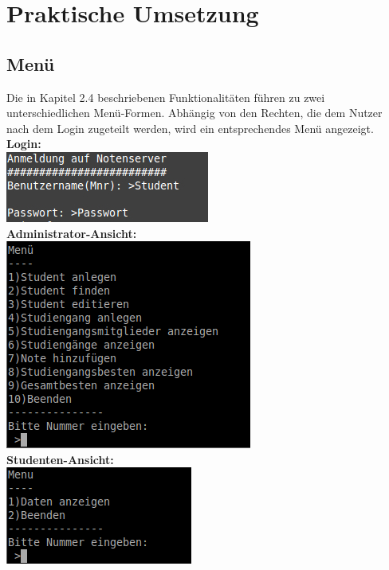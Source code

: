 \documentclass{scrartcl}
\begin{document}
\newpage
		
\section{Praktische Umsetzung}
	\subsection{Menü}
		Die in Kapitel 2.4 beschriebenen Funktionalitäten führen zu zwei unterschiedlichen Menü-Formen. Abhängig von den Rechten, die dem Nutzer nach dem Login zugeteilt werden, wird ein entsprechendes Menü angezeigt. \\
		
		\textbf{Login:}\\
		
		\includegraphics[scale=0.6]{Login.jpg}\\

		\textbf{Administrator-Ansicht:}\\

		\includegraphics[scale=1]{admin.png}\\

		\textbf{Studenten-Ansicht:}\\

		\includegraphics[scale=1]{student.png}\\
\end{document}
